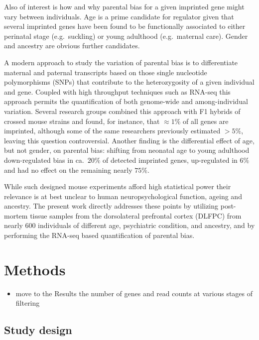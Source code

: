 \documentclass[letterpaper]{article}
\begin{document}
Also of interest is how and why parental bias for a given imprinted gene
might vary between individuals.  Age is a prime candidate for regulator
given that several imprinted genes have been found to be functionally associated to either
perinatal stage (e.g.~suckling) or young adulthood (e.g.~maternal care).
Gender and ancestry are obvious further candidates.

A modern approach to study the variation of parental bias is to differentiate
maternal and paternal transcripts based on those single nucleotide
polymorphisms (SNPs) that contribute to the heterozygosity of a given
individual and gene.  Coupled with high throughput techniques such as RNA-seq
this approach permits the quantification of both genome-wide and
among-individual variation.  Several research groups
\cite{Gregg2010a,Perez2015,DeVeale2012} combined this approach with F1 hybrids
of crossed mouse strains and found, for instance, that \(\approx 1\%\) of all
genes are imprinted, although some \cite{Perez2015} of the same researchers
previously estimated \(> 5\%\), leaving this question controversial.
Another finding is the differential effect of age, but not gender, on parental
bias: shifting from neonatal age to young adulthood down-regulated bias in
ca.~\(20\%\) of detected imprinted genes, up-regulated in \(6\%\) and had no
effect on the remaining nearly \(75\%\).

While such designed mouse experiments afford high statistical power their
relevance is at best unclear to human neuropsychological function, ageing and
ancestry.  The present work directly addresses these points by utilizing
post-mortem tissue samples from the dorsolateral prefrontal cortex (DLFPC)
from nearly 600 individuals of different age, psychiatric condition, and
ancestry, and by performing the RNA-seq based quantification of parental bias.

\section{Methods}

\begin{itemize}
\item move to the Results the number of genes and read counts at various stages of filtering
\end{itemize}

\subsection{Study design}
\end{document}
